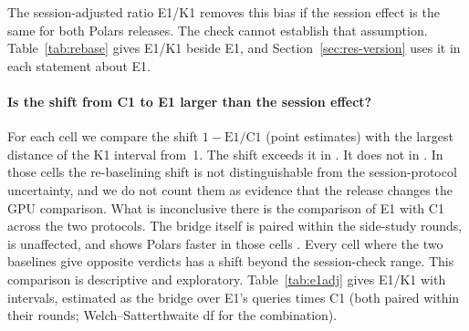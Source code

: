 \documentclass[11pt]{article}
\begin{document}
The session-adjusted ratio E1/K1 removes this bias if the session effect is the
same for both Polars releases. The check cannot establish that assumption.
Table~\ref{tab:rebase} gives E1/K1 beside E1, and Section~\ref{sec:res-version} uses it in each statement about E1.

\paragraph{Is the shift from C1 to E1 larger than the session effect?}
For each cell we compare the shift $1-\mathrm{E1}/\mathrm{C1}$ (point estimates)
with the largest distance of the K1 interval from~1. The shift exceeds it in
. It does not in . In
those cells the re-baselining shift is not distinguishable from the
session-protocol uncertainty, and we do not count them as evidence that the
release changes the GPU comparison. What is inconclusive there is the
comparison of E1 with C1 across the two protocols. The bridge itself is paired
within the side-study rounds, is unaffected, and shows Polars \polarsnew{}
faster in those cells . Every cell where the two
baselines give opposite verdicts has a shift beyond the session-check
range. This comparison is descriptive and
exploratory.
\ifeadj
Table~\ref{tab:e1adj} gives E1/K1 with intervals, estimated as the bridge over
E1's queries times C1 (both paired within their rounds; Welch--Satterthwaite
df for the combination).
\end{document}

